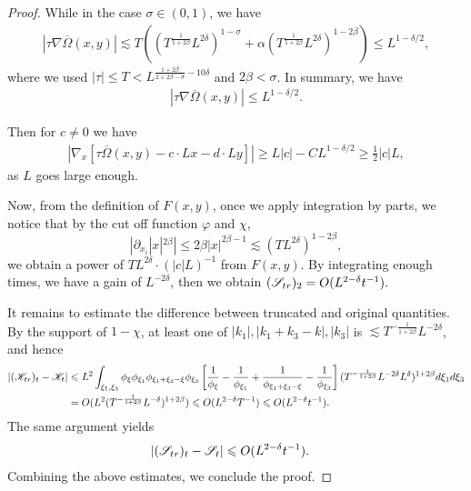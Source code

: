 \documentclass[10pt,a4paper]{amsart}
\def\dif{{\mathord{{\rm d}}}}
\def\geq{\geqslant}
\def\leq{\leqslant}
\begin{document}
\begin{proof}
While in the case $\sigma\in(0,1)$, we have 
\begin{align*}
   |\tau  \nabla  \overline \Omega(x,y)|\lesssim T((T^{\frac{1}{1+2\beta}}L^{2\delta})^{1-\sigma}+\alpha (T^{\frac{1}{1+2\beta}}L^{2\delta})^{1-2\beta})\leq L^{1-\delta/2},
\end{align*}
where we used $|\tau|\leq T < L^{\frac{1+2\beta}{2+2\beta-\sigma}-10\delta}$ and $2\beta<\sigma$. In summary, we have 
\begin{align*}
   |\tau  \nabla  \overline \Omega(x,y)| \leq L^{1-\delta/2}.
\end{align*}

Then for $c\neq 0$ we have
\begin{align*}
|   \nabla_x[ \tau \overline\Omega(x,y)-c\cdot Lx-d\cdot Ly]|\geq L|c|-CL^{1-\delta/2}\geq \frac12|c|L,
\end{align*}
as $L$ goes large enough.


Now, from the definition of $F(x,y)$,  once we apply integration by parts, 
we notice that by the cut off function $\varphi$ and $\chi$,  $$|\partial_{x_i}|x|^{2\beta}|\leq 2\beta|x|^{2\beta-1}\lesssim (TL^{2\delta})^{1-2\beta},$$ 
we obtain a power of $TL^{2\delta}\cdot (|c|L)^{-1}$ from $F(x,y)$. By  integrating enough times, we have a gain of $L^{-2\delta}$,  then we obtain $(\mathscr S_{\rm tr})_2 =O(L^{2-\delta} t^{-1}).$

It remains to estimate the difference between truncated and original quantities. By the support of $1-\chi$, at least one of $|k_1|,|k_1+k_3-k|,|k_3|$ is $\lesssim T^{-{\frac{1}{1+2\beta}}}L^{-2\delta}$, and hence
\begin{align*}
 | ( \mathscr K_{\rm tr})_t- \mathscr K_t|&\leq   L^{2} \int_{\xi_1,\xi_3}\phi_\xi \phi_{\xi_1} \phi_{\xi_1+\xi_3-\xi} \phi_{\xi_3}  \left[ \frac{1}{\phi_\xi} - \frac{1}{\phi_{\xi_1}} + \frac{1}{\phi_{\xi_1+\xi_3-\xi}} - \frac{1}{\phi_{\xi_3}} \right](T^{-{\frac{1}{1+2\beta}}}L^{-2\delta} L^{\delta})^{1+2\beta}\dif \xi_1\dif \xi_3\\
 &=O(L^2(T^{-{\frac{1}{1+2\beta}}}L^{-\delta})^{1+2\beta})\leq O(L^{2-\delta}T^{-1})\leq O(L^{2-\delta}t^{-1}).
\end{align*} The same argument yields
\begin{align*}
 | (\mathscr S_{\rm tr})_t- \mathscr S_t|&\leq  O(L^{2-\delta}t^{-1}).
\end{align*}Combining the above estimates, we conclude the proof.
\end{proof}
\end{document}
